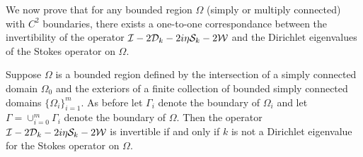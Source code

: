 We now prove that for any bounded region $\Omega$ (simply or multiply
connected) with $C^{2}$ boundaries, there exists a one-to-one correspondance
between the invertibility of the operator
$\mathcal I - 2{\mathcal D}_{k} - 2i\eta {\mathcal S}_{k} - 2{\mathcal W}$ and the Dirichlet eigenvalues
of the Stokes operator on $\Omega$. 

\begin{thrm}
  \label{thm:cfmain}
Suppose $\Omega$ is a bounded region defined by the intersection of a 
simply connected domain $\Omega_{0}$ and the exteriors of a finite collection
of bounded simply connected domains $\{ \Omega_{i} \}_{i=1}^{m}$.
As before let $\Gamma_{i}$ denote the boundary of $\Omega_{i}$ and let
$\Gamma = \cup_{i=0}^{m} \Gamma_{i}$ denote the boundary of $\Omega$.
Then the operator $\mathcal I - 2{\mathcal D}_{k} - 2i\eta {\mathcal S}_{k} - 2{\mathcal W}$
is invertible if and only if $k$ is not a Dirichlet eigenvalue
for the Stokes operator on $\Omega$.
\end{thrm}

